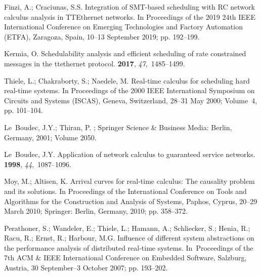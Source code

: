 \documentclass[electronics,article,accept,moreauthors,pdftex]{Definitions/mdpi}
\begin{document}
\begin{thebibliography}{999}
Finzi, A.; Craciunas, S.S.
\newblock Integration of SMT-based scheduling with RC network calculus analysis
  in TTEthernet networks.
\newblock  In Proceedings of the 2019 24th IEEE International Conference on Emerging Technologies and
  Factory Automation (ETFA), Zaragoza, Spain, 10--13 September 2019; pp. 192--199. %

Kermia, O.
\newblock Schedulability analysis and efficient scheduling of rate constrained
  messages in the ttethernet protocol.
 {\bf 2017}, {\em
  47},~1485--1499.

Thiele, L.; Chakraborty, S.; Naedele, M.
\newblock Real-time calculus for scheduling hard real-time systems.
\newblock  In Proceedings of the 2000 IEEE International Symposium on Circuits and Systems (ISCAS), Geneva, Switzerland,  28--31 May 2000; Volume~4, pp. 101--104. %

Le~Boudec, J.Y.; Thiran, P.
;  Springer Science \& Business Media:  Berlin, Germany, 2001; Volume 2050. %

Le~Boudec, J.Y.
\newblock Application of network calculus to guaranteed service networks.
 {\bf 1998}, {\em
  44},~1087--1096.

Moy, M.; Altisen, K.
\newblock Arrival curves for real-time calculus: The causality problem and its
  solutions.
\newblock  In Proceedings of the International Conference on Tools and Algorithms for the
  Construction and Analysis of Systems, Paphos, Cyprus, 20--29 March 2010; Springer: Berlin, Germany, 2010; pp. 358--372. %

Perathoner, S.; Wandeler, E.; Thiele, L.; Hamann, A.; Schliecker, S.; Henia,
  R.; Racu, R.; Ernst, R.; Harbour, M.G.
\newblock Influence of different system abstractions on the performance
  analysis of distributed real-time systems.
\newblock  In~Proceedings of the 7th ACM \& IEEE International Conference on
  Embedded Software, Salzburg, Austria, 30 September--3 October  2007; pp. 193--202. %

\end{thebibliography}
\end{document}
